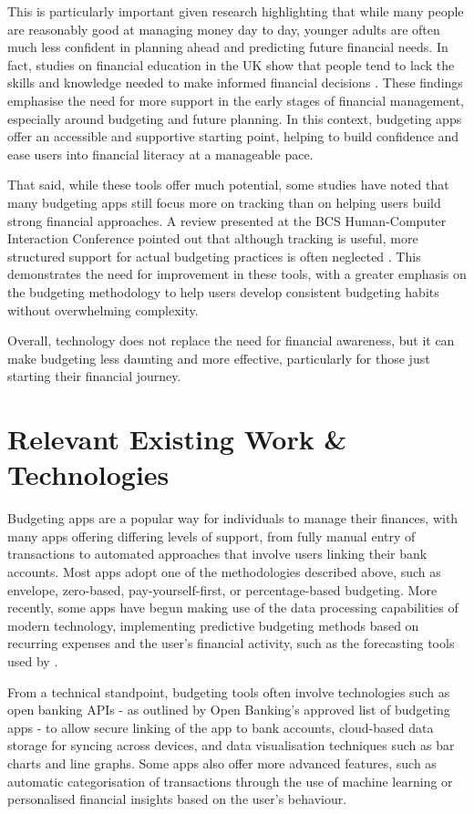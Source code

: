 \documentclass{l4proj}
\begin{document}
This is particularly important given research highlighting that while many people are reasonably good at managing money day to day, younger adults are often much less confident in planning ahead and predicting future financial needs. In fact, studies on financial education in the UK show that people tend to lack the skills and knowledge needed to make informed financial decisions \citep{stillwell_financial_2016}. These findings emphasise the need for more support in the early stages of financial management, especially around budgeting and future planning. In this context, budgeting apps offer an accessible and supportive starting point, helping to build confidence and ease users into financial literacy at a manageable pace.

That said, while these tools offer much potential, some studies have noted that many budgeting apps still focus more on tracking than on helping users build strong financial approaches. A review presented at the BCS Human-Computer Interaction Conference pointed out that although tracking is useful, more structured support for actual budgeting practices is often neglected \citep{alenazi_evaluating_2023}. This demonstrates the need for improvement in these tools, with a greater emphasis on the budgeting methodology to help users develop consistent budgeting habits without overwhelming complexity.

Overall, technology does not replace the need for financial awareness, but it can make budgeting less daunting and more effective, particularly for those just starting their financial journey.

\section{Relevant Existing Work \& Technologies}
Budgeting apps are a popular way for individuals to manage their finances, with many apps offering differing levels of support, from fully manual entry of transactions to automated approaches that involve users linking their bank accounts. Most apps adopt one of the methodologies described above, such as envelope, zero-based, pay-yourself-first, or percentage-based budgeting. More recently, some apps have begun making use of the data processing capabilities of modern technology, implementing predictive budgeting methods based on recurring expenses and the user’s financial activity, such as the forecasting tools used by \citet{moneypatrol_personal_nodate}.

From a technical standpoint, budgeting tools often involve technologies such as open banking APIs - as outlined by Open Banking’s approved list of budgeting apps \citep{noauthor_open_nodate} - to allow secure linking of the app to bank accounts, cloud-based data storage for syncing across devices, and data visualisation techniques such as bar charts and line graphs. Some apps also offer more advanced features, such as automatic categorisation of transactions through the use of machine learning or personalised financial insights based on the user’s behaviour.
\end{document}
